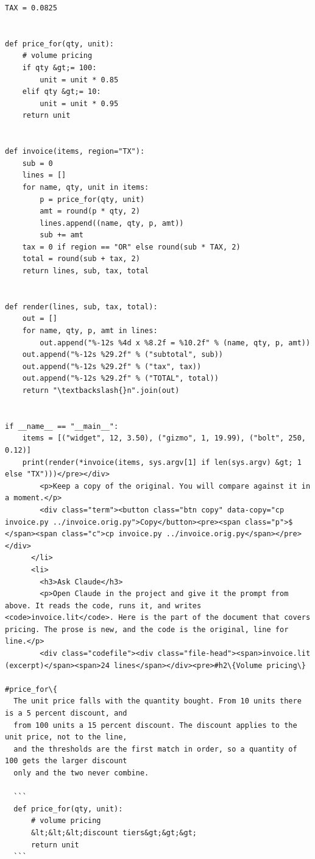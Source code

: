 \documentclass[10pt,a4paper]{article}
\begin{document}
\begin{Verbatim}
TAX = 0.0825


def price_for(qty, unit):
    # volume pricing
    if qty &gt;= 100:
        unit = unit * 0.85
    elif qty &gt;= 10:
        unit = unit * 0.95
    return unit


def invoice(items, region="TX"):
    sub = 0
    lines = []
    for name, qty, unit in items:
        p = price_for(qty, unit)
        amt = round(p * qty, 2)
        lines.append((name, qty, p, amt))
        sub += amt
    tax = 0 if region == "OR" else round(sub * TAX, 2)
    total = round(sub + tax, 2)
    return lines, sub, tax, total


def render(lines, sub, tax, total):
    out = []
    for name, qty, p, amt in lines:
        out.append("%-12s %4d x %8.2f = %10.2f" % (name, qty, p, amt))
    out.append("%-12s %29.2f" % ("subtotal", sub))
    out.append("%-12s %29.2f" % ("tax", tax))
    out.append("%-12s %29.2f" % ("TOTAL", total))
    return "\textbackslash{}n".join(out)


if __name__ == "__main__":
    items = [("widget", 12, 3.50), ("gizmo", 1, 19.99), ("bolt", 250, 0.12)]
    print(render(*invoice(items, sys.argv[1] if len(sys.argv) &gt; 1 else "TX")))</pre></div>
        <p>Keep a copy of the original. You will compare against it in a moment.</p>
        <div class="term"><button class="btn copy" data-copy="cp invoice.py ../invoice.orig.py">Copy</button><pre><span class="p">$ </span><span class="c">cp invoice.py ../invoice.orig.py</span></pre></div>
      </li>
      <li>
        <h3>Ask Claude</h3>
        <p>Open Claude in the project and give it the prompt from above. It reads the code, runs it, and writes <code>invoice.lit</code>. Here is the part of the document that covers pricing. The prose is new, and the code is the original, line for line.</p>
        <div class="codefile"><div class="file-head"><span>invoice.lit (excerpt)</span><span>24 lines</span></div><pre>#h2\{Volume pricing\}

#price_for\{
  The unit price falls with the quantity bought. From 10 units there is a 5 percent discount, and
  from 100 units a 15 percent discount. The discount applies to the unit price, not to the line,
  and the thresholds are the first match in order, so a quantity of 100 gets the larger discount
  only and the two never combine.

  ```
  def price_for(qty, unit):
      # volume pricing
      &lt;&lt;&lt;discount tiers&gt;&gt;&gt;
      return unit
  ```


\end{Verbatim}
\end{document}
